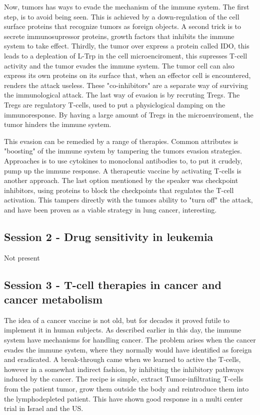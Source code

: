 \documentclass[12p]{article}
\begin{document}
Now, tumors has ways to evade the mechanism of the immune system.
The first step, is to avoid being seen.
This is achieved by a down-regulation of the cell surface proteins that recognize tumors as foreign objects.
A second trick is to secrete immunosupressor proteins, growth factors that inhibits the immune system to take effect.
Thirdly, the tumor over express a protein called IDO, this leads to a depleation of L-Trp in the cell microenciroment, this supresses T-cell activity and the tumor evades the immune system.
The tumor cell can also express its own proteins on its surface that, when an effector cell is encountered, renders the attack useless.
These "co-inhibitors" are a separate way of surviving the immunological attack.
The last way of evasion is by recruting Tregs.
The Tregs are regulatory T-cells, used to put a physiclogical damping on the immunoresponse.
By having a large amount of Tregs in the microenviroment, the tumor hinders the immune system.

This evasion can be remedied by a range of therapies.
Common attributes is "boosting" of the immune system by tampering the tumors evasion strategies.
Approaches is to use cytokines to  monoclonal antibodies to, to put it crudely, pump up the immune response.
A therapeutic vaccine by activating T-cells is another approach.
The last option mentioned by the speaker was checkpoint inhibitors, using proteins to block the checkpoints that regulates the T-cell activation.
This tampers directly with the tumors ability to "turn off" the attack, and have been proven as a viable strategy in lung cancer, interesting.


\subsection*{Session 2 - Drug sensitivity in leukemia}

Not present

\subsection*{Session 3 - T-cell therapies in cancer and cancer metabolism}

The idea of a cancer vaccine is not old, but for decades it proved futile to implement it in human subjects.
As described earlier in this day, the immune system have mechanisms for handling cancer.
The problem arises when the cancer evades the immune system, where they normally would have identified as foreign and eradicated.
A break-through came when we learned to active the T-cells, however in a somewhat indirect fashion, by inhibiting the inhibitory pathways induced by the cancer.
The recipe is simple, extract Tumor-infiltrating T-cells from the patient tumor, grow them outside the body and reintroduce them into the lymphodepleted patient.
This have shown good response in a multi center trial in Israel and the US.
\end{document}
